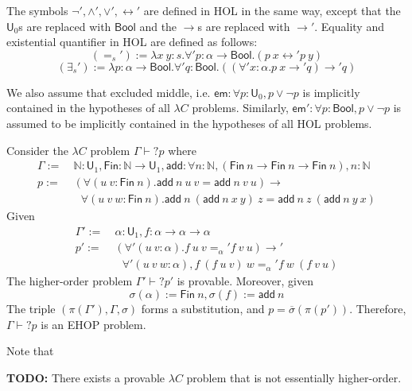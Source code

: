 \noindent The symbols $\neg', \land', \lor', \leftrightarrow'$ are defined in HOL in the
same way, except that the $\mathsf{U}_0$s are replaced with $\mathsf{Bool}$ and the $\to$s are
replaced with $\to'$. Equality and existential quantifier in HOL are defined as follows:
$$(=_s') := \lambda x \ y : s. \forall' p : \alpha \to \mathsf{Bool}. (p \ x \leftrightarrow' p \ y)$$
$$(\exists_s') := \lambda p : \alpha \to \mathsf{Bool}. \forall' q : \mathsf{Bool}. ((\forall' x : \alpha. p \ x \to' q) \to' q)$$

\noindent We also assume that excluded middle, i.e. $\mathsf{em} : \forall p : \mathsf{U}_0, p \lor \neg p$
is implicitly contained in the hypotheses of all $\lambda C$ problems. Similarly, $\mathsf{em}' : \forall p : \mathsf{Bool}, p \lor \neg p$
is assumed to be implicitly contained in the hypotheses of all HOL problems.

\begin{example} Consider the $\lambda C$ problem $\Gamma \vdash? p$ where
\begin{align*}
  \Gamma := \ & \mathbb{N} : \mathsf{U}_1, \mathsf{Fin} : \mathbb{N} \to \mathsf{U}_1,
  \mathsf{add} : \forall n : \mathbb{N}, (\mathsf{Fin} \ n \to \mathsf{Fin} \ n \to \mathsf{Fin} \ n), n : \mathbb{N} \\
  p := \ & (\forall (u \ v : \mathsf{Fin} \ n). \mathsf{add} \ n \ u \ v = \mathsf{add} \ n \ v \ u) \to \\
  & \ \ \ \forall (u \ v \ w : \mathsf{Fin} \ n). \mathsf{add} \ n \ (\mathsf{add} \ n \ x \ y) \ z = \mathsf{add} \ n \ z \ (\mathsf{add} \ n \ y \ x)
\end{align*}
Given
\begin{align*}
  \Gamma' := \ & \alpha : \mathsf{U}_1, f : \alpha \to \alpha \to \alpha \\
  p' := \ & (\forall' (u \ v : \alpha). f \ u \ v =_\alpha' f \ v \ u) \to' \\
  & \ \ \ \forall' (u \ v \ w : \alpha), f \ (f \ u \ v) \ w =_\alpha' f \ w \ (f \ v \ u)
\end{align*}
The higher-order problem $\Gamma' \vdash? p'$ is provable. Moreover, given
$$\sigma(\alpha) := \mathsf{Fin} \ n, \sigma(f) := \mathsf{add} \ n$$
The triple $(\pi(\Gamma'), \Gamma, \sigma)$ forms a substitution, and $p = \overline{\sigma}(\pi(p'))$.
Therefore, $\Gamma \vdash? p$ is an EHOP problem.
\end{example}

\noindent Note that

\noindent \textbf{TODO:} There exists a provable $\lambda C$ problem that
is not essentially higher-order.
